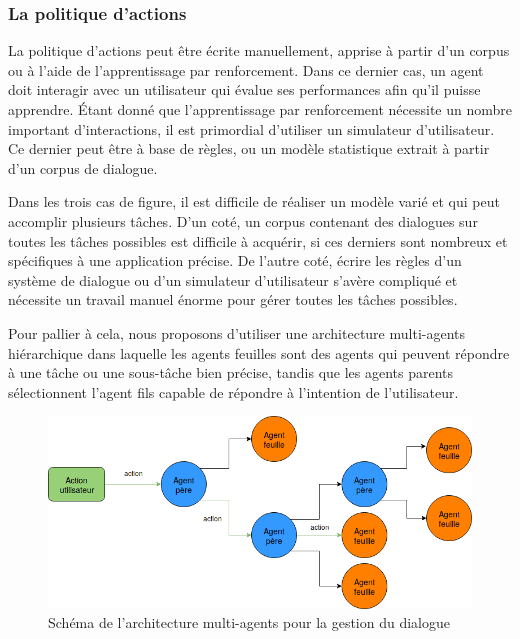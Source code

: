 \subsubsection{La politique d'actions}
La politique d'actions peut être écrite manuellement, apprise à partir d'un corpus ou à l'aide de l'apprentissage par renforcement. Dans ce dernier cas, un agent doit interagir avec un utilisateur qui évalue ses performances afin qu'il puisse apprendre. Étant donné que l'apprentissage par renforcement nécessite un nombre important d'interactions, il est primordial d'utiliser un simulateur d'utilisateur. Ce dernier peut être à base de règles, ou un modèle statistique extrait à partir d'un corpus de dialogue.
\par Dans les trois cas de figure, il est difficile de réaliser un modèle varié et qui peut accomplir plusieurs tâches. D'un coté, un corpus contenant des dialogues sur toutes les tâches possibles est difficile à acquérir, si ces derniers sont nombreux et spécifiques à une application précise. De l'autre coté, écrire les règles d'un système de dialogue ou d'un simulateur d'utilisateur s'avère compliqué et nécessite un travail manuel énorme pour gérer toutes les tâches possibles.
\par Pour pallier à cela, nous proposons d'utiliser une architecture multi-agents hiérarchique dans laquelle les agents feuilles sont des agents qui peuvent répondre à une tâche ou une sous-tâche bien précise, tandis que les agents parents sélectionnent l'agent fils capable de répondre à l'intention de l'utilisateur.
\begin{figure}[H] 
	
	\centering
	\includegraphics[width=0.8\linewidth]{images/Conception/DM/multiagent.png}
	\caption{Schéma de l'architecture multi-agents pour la gestion du dialogue}
\end{figure}\label{multiagent}
